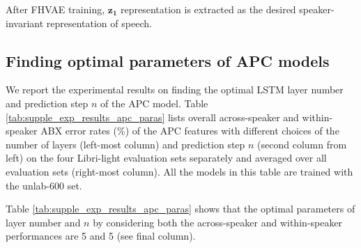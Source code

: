 \documentclass[transmag]{IEEEtran}
\begin{document}
After FHVAE training, 
$\bm{z_1}$ representation  is extracted as the desired speaker-invariant  representation of speech.

\subsection{Finding optimal parameters of APC models}
\label{subsec:supple_apc_para}
We report the experimental results on finding the optimal LSTM layer number and prediction step $n$ of the APC model.
Table \ref{tab:supple_exp_results_apc_paras} lists overall across-speaker and within-speaker ABX error rates ($\%$) of the APC features with different choices of the number of layers (left-most column) and prediction step $n$ (second column from left) on the four Libri-light evaluation sets separately and averaged over all evaluation sets (right-most column). All the models in this table are trained with the unlab-600 set.

Table \ref{tab:supple_exp_results_apc_paras} shows that  the optimal parameters of layer number and $n$ by considering both the across-speaker and within-speaker performances are 5 and 5 (see final column).
\end{document}
